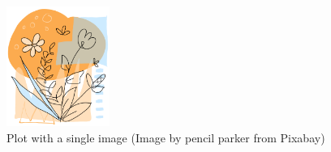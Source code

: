 \begin{figure}[ht]
    \centering
    \includegraphics[width=0.3\textwidth]{Chapters/Chapter_2/figures/image1.png}
    \caption{Plot with a single image (Image by pencil parker from Pixabay)}
    \label{fig:figure2_1}
\end{figure}